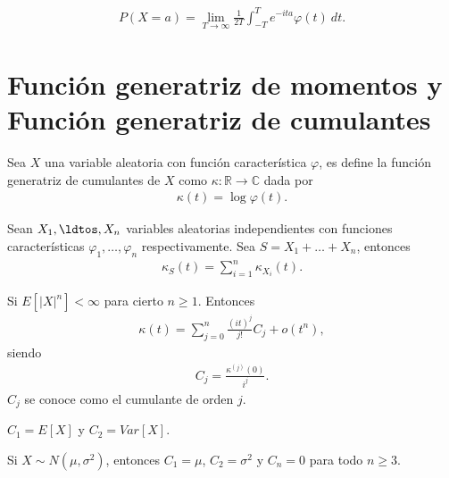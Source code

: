 \begin{lema}
    \begin{align*}
        P(X = a) = \lim_{T \to \infty} \frac{1}{2T} \int_{-T}^{T} e^{-ita} \varphi(t) \ dt.
    \end{align*}
\end{lema}

\section{Función generatriz de momentos y Función generatriz de cumulantes}
\begin{defi}
    Sea $X$ una variable aleatoria con función característica $\varphi$, es define la función generatriz de cumulantes de $X$ como $\kappa : \mathbb{R} \longrightarrow \mathbb{C}$ dada por
    \begin{align*}
        \kappa(t) = \log \varphi(t).
    \end{align*}
\end{defi}

\begin{prop}
    Sean $X_1,\ldtos, X_n$  variables aleatorias independientes con funciones características $\varphi_1,\ldots,\varphi_n$ respectivamente. Sea $S = X_1 + \ldots + X_n$, entonces
    \begin{align*}
        \kappa_S(t) = \sum_{i=1}^{n} \kappa_{X_i}(t).
    \end{align*}
\end{prop}

\begin{teo}
    Si $E[|X|^n] < \infty$ para cierto $n \ge 1$. Entonces
    \begin{align*}
        \kappa(t) = \sum_{j=0}^{n} \frac{(it)^j}{j!} C_j + o(t^n),
    \end{align*}
    siendo
    \begin{align*}
        C_j = \frac{\kappa^{(j)}(0)}{i^j}.
    \end{align*}
    $C_j$ se conoce como el cumulante de orden $j$.
\end{teo}

\begin{obs}
$C_1 = E[X]$ y $C_2 = Var[X]$.
\end{obs}

\begin{obs}
    Si $X \sim N(\mu, \sigma^2)$, entonces $C_1 = \mu$, $C_2 = \sigma^2$ y $C_n = 0$ para todo $n \ge 3$.
\end{obs}

